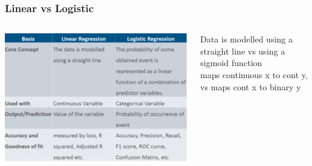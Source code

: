 \documentclass{beamer}
\begin{document}
\begin{frame}\frametitle{Linear vs Logistic}
	\begin{columns}
		\begin{column}{0.6\textwidth}
			\includegraphics[scale=0.45]{regression/linearlogistic}
		\end{column}
		\begin{column}{0.2\textwidth}
			Data is modelled using a straight line vs using a sigmoid function\\
			maps continuous x to cont y, vs maps cont x to binary y 
		\end{column}
	\end{columns}

\end{frame}
\end{document}
